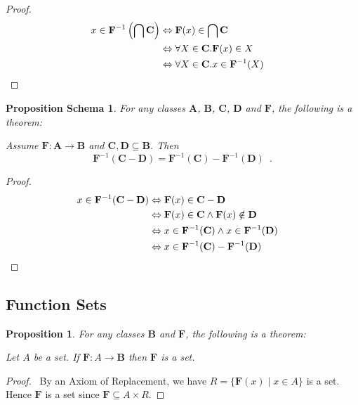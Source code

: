 \documentclass{book}
\let\qed\relax
\newtheorem{prop}[ax]{Proposition}
\newtheorem{props}[ax]{Proposition Schema}
\theoremstyle{definition}
\begin{document}
\begin{proof}
\pf
\begin{align*}
x \in \mathbf{F}^{-1} \left( \bigcap \mathbf{C} \right)
& \Leftrightarrow \mathbf{F}(x) \in \bigcap \mathbf{C} \\
& \Leftrightarrow \forall X \in \mathbf{C}. \mathbf{F}(x) \in X \\
& \Leftrightarrow \forall X \in \mathbf{C}. x \in \mathbf{F}^{-1}(X) & \qed
\end{align*}
\end{proof}

\begin{props}
For any classes $\mathbf{A}$, $\mathbf{B}$, $\mathbf{C}$, $\mathbf{D}$ and $\mathbf{F}$, the following is a theorem:

Assume $\mathbf{F} : \mathbf{A} \rightarrow \mathbf{B}$ and $\mathbf{C}, \mathbf{D} \subseteq \mathbf{B}$. Then
\[ \mathbf{F}^{-1}(\mathbf{C} - \mathbf{D}) = \mathbf{F}^{-1}(\mathbf{C}) - \mathbf{F}^{-1}(\mathbf{D}) \enspace . \]
\end{props}

\begin{proof}
\pf
\begin{align*}
x \in \mathbf{F}^{-1}(\mathbf{C} - \mathbf{D}) & \Leftrightarrow \mathbf{F}(x) \in \mathbf{C} - \mathbf{D} \\
& \Leftrightarrow \mathbf{F}(x) \in \mathbf{C} \wedge \mathbf{F}(x) \notin \mathbf{D} \\
& \Leftrightarrow x \in \mathbf{F}^{-1}(\mathbf{C}) \wedge x \in \mathbf{F}^{-1}(\mathbf{D}) \\
& \Leftrightarrow x \in \mathbf{F}^{-1}(\mathbf{C}) - \mathbf{F}^{-1}(\mathbf{D}) & \qed
\end{align*}
\end{proof}

\subsection{Function Sets}

\begin{prop}
For any classes $\mathbf{B}$ and $\mathbf{F}$, the following is a theorem:

Let $A$ be a set. If $\mathbf{F} : A \rightarrow \mathbf{B}$ then $\mathbf{F}$ is a set.
\end{prop}

\begin{proof}
\pf\ By an Axiom of Replacement, we have $R = \{ \mathbf{F}(x) \mid x \in A \}$ is a set. Hence $\mathbf{F}$ is a set since $\mathbf{F} \subseteq A \times R$. \qed
\end{proof}
\end{document}
